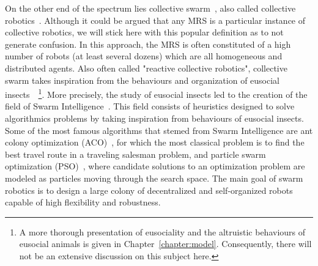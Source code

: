     On the other end of the spectrum lies collective swarm~\parencite{Beni2005}, also called collective robotics~\parencite{Kube1993, Parker2008}. Although it could be argued that any MRS is a particular instance of collective robotics, we will stick here with this popular definition as to not generate confusion. In this approach, the MRS is often constituted of a high number of robots (at least several dozens) which are all homogeneous and distributed agents. Also often called "reactive collective robotics", collective swarm takes inspiration from the behaviours and organization of eusocial insects~\parencite{Wilson1998, Werfel2014}~\footnote{A more thorough presentation of eusociality and the altruistic behaviours of eusocial animals is given in Chapter~\ref{chapter:model}. Consequently, there will not be an extensive discussion on this subject here.}. More precisely, the study of eusocial insects led to the creation of the field of Swarm Intelligence~\parencite{Bonabeau1999, Zoghby2013}. This field consists of heuristics designed to solve algorithmics problems by taking inspiration from behaviours of eusocial insects. Some of the most famous algorithms that stemed from Swarm Intelligence are ant colony optimization (ACO)~\parencite{Dorigo2004a}, for which the most classical problem is to find the best travel route in a traveling salesman problem, and particle swarm optimization (PSO)~\parencite{Kennedy1995}, where candidate solutions to an optimization problem are modeled as particles moving through the search space. The main goal of swarm robotics is to design a large colony of decentralized and self-organized robots capable of high flexibility and robustness.

